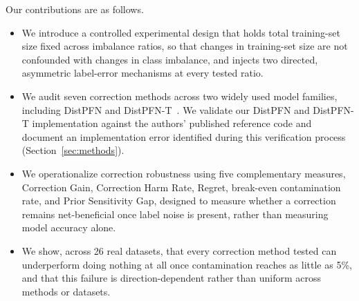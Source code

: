 Our contributions are as follows.

\begin{itemize}
\item We introduce a controlled experimental design that holds total training-set
size fixed across imbalance ratios, so that changes in training-set size are not
confounded with changes in class imbalance, and injects two directed, asymmetric
label-error mechanisms at every tested ratio.
\item We audit seven correction methods across two widely used model families,
including DistPFN and DistPFN-T~\cite{lee2026distpfn}. We validate our DistPFN and
DistPFN-T implementation against the authors' published reference code and document
an implementation error identified during this verification process
(Section~\ref{sec:methods}).
\item We operationalize correction robustness using five complementary measures,
Correction Gain, Correction Harm Rate, Regret, break-even contamination rate,
and Prior Sensitivity Gap, designed to measure whether a correction remains
net-beneficial once label noise is present, rather than measuring model
accuracy alone.
\item We show, across 26 real datasets, that every correction method tested can
underperform doing nothing at all once contamination reaches as little as 5\%, and
that this failure is direction-dependent rather than uniform across methods or
datasets.
\end{itemize}
